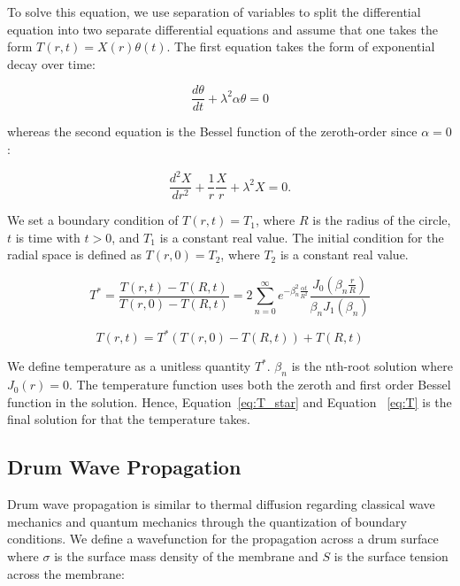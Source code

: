 \documentclass[linenumbers, RNAAS, trackchanges]{aastex631}
\begin{document}
To solve this equation, we use separation of variables to split the 
differential equation into two separate differential equations and assume
that one takes the form $T(r,t)=X(r)\theta(t)$. The first equation takes the
form of exponential decay over time:

\begin{equation}
    \frac{d\theta}{dt}+\lambda^2\alpha\theta=0
\end{equation}

\noindent whereas the second equation is the Bessel function of the zeroth-order
since $\alpha=0$:

\begin{equation}
    \frac{d^2X}{dr^2}+\frac{1}{r}\frac{X}{r}+\lambda^2X=0.
\end{equation}

We set a boundary condition of $T(r,t)=T_1$, where $R$ is the radius of the circle,
$t$ is time with $t>0$, and $T_1$ is a constant real value. The initial condition for
the radial space is defined as $T(r,0)=T_2$, where $T_2$ is a constant real value.

\begin{equation}
    T^*=\frac{T(r,t)-T(R,t)}{T(r,0)-T(R,t)}=2\sum_{n=0}^\infty e^{-\beta_{n}^2 \frac{\alpha t}{R^2}} \frac{J_0(\beta_n\frac{r}{R})}{\beta_nJ_1(\beta_n)}
    \label{eq:T_star}
\end{equation}

\begin{equation}
    T(r,t)=T^*(T(r,0)-T(R,t))+T(R,t)
    \label{eq:T}
\end{equation}

\noindent We define temperature as a unitless quantity $T^*$. $\beta_n$ is the
nth-root solution where $J_0(r)=0$. The temperature function uses both the zeroth
and first order Bessel function in the solution. Hence, Equation~\ref{eq:T_star}
and Equation ~\ref{eq:T} is the final solution for that the temperature takes.


\subsection{Drum Wave Propagation}

Drum wave propagation is similar to thermal diffusion regarding classical wave 
mechanics and quantum mechanics through the quantization of boundary conditions.
We define a wavefunction for the propagation across a drum surface where $\sigma$
is the surface mass density of the membrane and $S$ is the surface tension
across the membrane:
\end{document}
